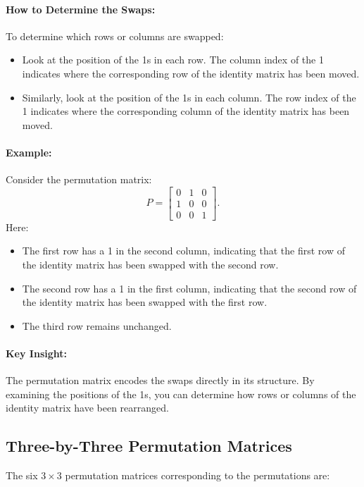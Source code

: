 \documentclass{article}
\begin{document}
\paragraph{How to Determine the Swaps:}
To determine which rows or columns are swapped:
\begin{itemize}
    \item Look at the position of the 1s in each row. The column index of the 1 indicates where the corresponding row of the identity matrix has been moved.
    \item Similarly, look at the position of the 1s in each column. The row index of the 1 indicates where the corresponding column of the identity matrix has been moved.
\end{itemize}

\paragraph{Example:}
Consider the permutation matrix:
\[
P = \begin{bmatrix}
0 & 1 & 0 \\
1 & 0 & 0 \\
0 & 0 & 1
\end{bmatrix}.
\]
Here:
\begin{itemize}
    \item The first row has a 1 in the second column, indicating that the first row of the identity matrix has been swapped with the second row.
    \item The second row has a 1 in the first column, indicating that the second row of the identity matrix has been swapped with the first row.
    \item The third row remains unchanged.
\end{itemize}

\paragraph{Key Insight:}
The permutation matrix encodes the swaps directly in its structure. By examining the positions of the 1s, you can determine how rows or columns of the identity matrix have been rearranged.

\subsection*{Three-by-Three Permutation Matrices}
The six $3 \times 3$ permutation matrices corresponding to the permutations are:
\end{document}
